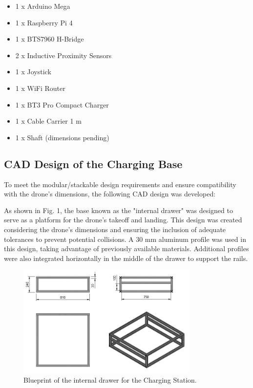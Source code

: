\begin{itemize}
    \item 1 x Arduino Mega
    \item 1 x Raspberry Pi 4
    \item 1 x BTS7960 H-Bridge
    \item 2 x Inductive Proximity Sensors
    \item 1 x Joystick
    \item 1 x WiFi Router
    \item 1 x BT3 Pro Compact Charger
    \item 1 x Cable Carrier 1 m
    \item 1 x Shaft (dimensions pending)
\end{itemize}

\subsection{CAD Design of the Charging Base}

To meet the modular/stackable design requirements and ensure compatibility with the drone's dimensions, the following CAD design was developed:

As shown in Fig. 1, the base known as the "internal drawer" was designed to serve as a platform for the drone's takeoff and landing. This design was created considering the drone's dimensions and ensuring the inclusion of adequate tolerances to prevent potential collisions. A 30 mm aluminum profile was used in this design, taking advantage of previously available materials. Additional profiles were also integrated horizontally in the middle of the drawer to support the rails.
        \begin{figure}[H]
            \centering
            \includegraphics[width=0.8\textwidth]{PLANOS/PLANOS_CAJON_INTERNO_1.png}
            \caption{Blueprint of the internal drawer for the Charging Station.}
            \label{fig:etiqueta}
        \end{figure}
        
